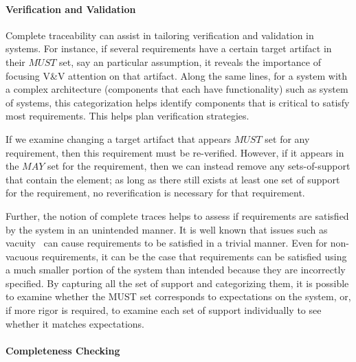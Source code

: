 \paragraph{Verification and Validation}

Complete traceability can assist in tailoring verification and validation in systems. For instance, if several requirements have a certain target artifact in their $MUST$ set, say an particular assumption, it reveals the importance of focusing V\&V attention on that artifact. Along the same lines, for a system with a complex architecture (components that each have functionality) such as  system of systems, this categorization helps identify components that is critical to satisfy most requirements. This helps plan verification strategies.

If we examine changing a target artifact that appears $MUST$ set for any requirement, then this requirement must be re-verified. However, if it appears in the $MAY$ set for the requirement, then we can instead remove any sets-of-support that contain the element; as long as there still exists at least one set of support for the requirement, no reverification is necessary for that requirement.

Further, the notion of complete traces helps to assess if requirements are satisfied by the system in an unintended manner. It is well known that issues such as vacuity~\cite{Kupferman03:Vacuity} can cause requirements to be satisfied in a trivial manner. Even for non-vacuous requirements, it can be the case that requirements can be satisfied using a much smaller portion of the system than intended because they are incorrectly specified.  By capturing all the set of support and categorizing them, it is possible to examine whether the MUST set corresponds to expectations on the system, or, if more rigor is required, to examine each set of support individually to see whether it matches expectations.

\paragraph{Completeness Checking}

